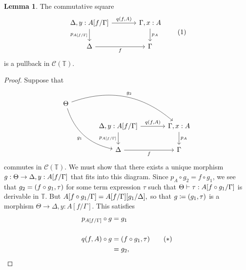 \documentclass[10pt,letterpaper,cm]{nupset}
\theoremstyle{definition}
\theoremstyle{theorem}
\newtheorem{lemma}[definition]{Lemma}
\theoremstyle{remark}
\newcommand{\0}{\mathbf{0}}
\newcommand{\1}{\mathbf{1}}
\newcommand{\2}{\mathbf{2}}
\renewcommand{\c}{\mathscr{C}}
\newcommand{\T}{\mathbb T}
\begin{document}
\begin{lemma}
The commutative square
\begin{equation}
\label{eqn: cansyn} \begin{tikzcd}[column sep=large]
{\Delta, y : A\mleft[f/\Gamma\mright]} \arrow[d, "{p_{A\mleft[f/\Gamma\mright]}}"'] \arrow[r, "{q(f,A)}"] & {\Gamma, x :A} \arrow[d, "p_A"] \\
\Delta \arrow[r, "f"']                                                                                  & \Gamma                           
\end{tikzcd} \tag{1}
\end{equation}
 is a pullback  in $\c(\T)$.
\end{lemma}
\begin{proof}
Suppose that
\[
\begin{tikzcd}[column sep=large]
\Theta \arrow[rdd, "g_1"', bend right] \arrow[rrd, "g_2", bend left] &                                                                                                          &                                   \\
                                                                     & {\Delta, y : A\mleft[f/\Gamma\mright]} \arrow[d, "{p_{A\mleft[f/\Gamma\mright]}}"'] \arrow[r, "{q(f,A)}"] & {\Gamma, x :A} \arrow[d, "p_A"] \\
                                                                     & \Delta \arrow[r, "f"']                                                                                   & \Gamma                           
\end{tikzcd}
\] commutes in $\c(\T)$. We must show that there exists a unique morphism $g : \Theta \to {\Delta, y : A\mleft[f/\Gamma\mright]}$  that fits into this diagram. Since $p_A \circ g_2 = f \circ g_1$, we see that $g_2 = \mleft( f \circ g_1, \tau \mright)$ for some term expression $\tau$ such that $\Theta \vdash \tau : A\mleft[f \circ g_1/\Gamma \mright]$ is derivable in $\T$. But $A\mleft[f \circ g_1/\Gamma \mright] = A\mleft[f/\Gamma\mright]\mleft[g_1/\Delta\mright],$ so that $g \coloneqq \mleft(g_1, \tau\mright)$ is a morphism $\Theta \to {\Delta, y :A[f/\Gamma]}$. This satisfies 
\begin{align*}
 p_{A\mleft[f/\Gamma\mright]} \circ g  & = g_1 
\\ & 
\\ \label{eqn:one} q(f,A) \circ g  & =  \mleft(f \circ g_1, \tau\mright) \tag{$\ast$}
\\ & = g_2,
\end{align*}

\end{proof}
\end{document}

